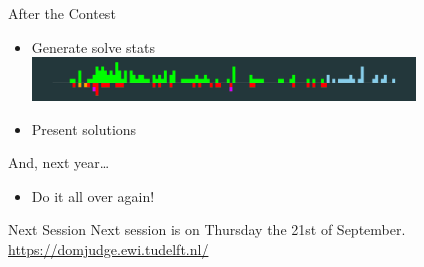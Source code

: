 \documentclass[11pt,pdf, aspectratio=169]{beamer}
\begin{document}
  \begin{frame}{After the Contest}
    \begin{itemize}
      \item Generate solve stats \\[0.5em]
        \includegraphics[width=0.8\textwidth]{images/session-3/solve-stats.png}
      \item Present solutions
    \end{itemize}

    \vspace{2em}
    And, next year\dots

    \begin{itemize}
      \item Do it all over again!
    \end{itemize}
  \end{frame}

  \begin{frame}{Next Session}
    Next session is on Thursday the 21st of September.\\

    \url{https://domjudge.ewi.tudelft.nl/}
  \end{frame}
\end{document}
